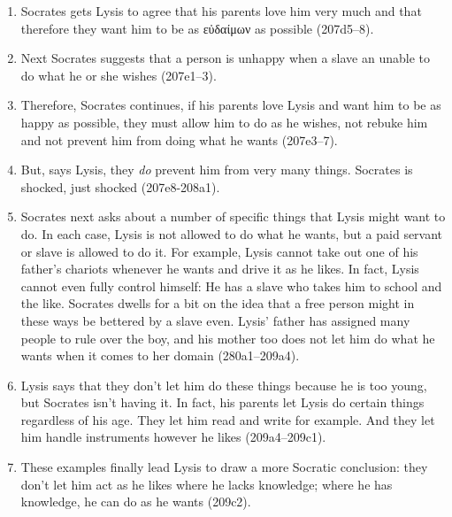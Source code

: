 \documentclass[11pt]{article}
\begin{document}
\begin{enumerate}

    \item Socrates gets Lysis to agree that his parents love him very much and
        that therefore they want him to be as {\g εὐδαίμων} as possible
        (207d5--8).

    \item Next Socrates suggests that a person is unhappy when a slave an
        unable to do what he or she wishes (207e1--3).

    \item Therefore, Socrates continues, if his parents love Lysis and want him
        to be as happy as possible, they must allow him to do as he wishes, not
        rebuke him and not prevent him from doing what he wants (207e3--7).

    \item But, says Lysis, they \emph{do} prevent him from very many things.
        Socrates is shocked, just shocked (207e8-208a1).

    \item Socrates next asks about a number of specific things that Lysis might
        want to do.  In each case, Lysis is not allowed to do what he wants,
        but a paid servant or slave is allowed to do it.  For example, Lysis
        cannot take out one of his father's chariots whenever he wants and
        drive it as he likes.  In fact, Lysis cannot even fully control
        himself: He has a slave who takes him to school and the like.  Socrates
        dwells for a bit on the idea that a free person might in these ways be
        bettered by a slave even.  Lysis' father has assigned many people to
        rule over the boy, and his mother too does not let him do what he wants
        when it comes to her domain (280a1--209a4).

    \item Lysis says that they don't let him do these things because he is too
        young, but Socrates isn't having it.  In fact, his parents let Lysis do
        certain things regardless of his age.  They let him read and write for
        example.  And they let him handle instruments however he likes
        (209a4--209c1).

    \item These examples finally lead Lysis to draw a more Socratic conclusion:
        they don't let him act as he likes where he lacks knowledge; where he
        has knowledge, he can do as he wants (209c2).


\end{enumerate}
\end{document}
